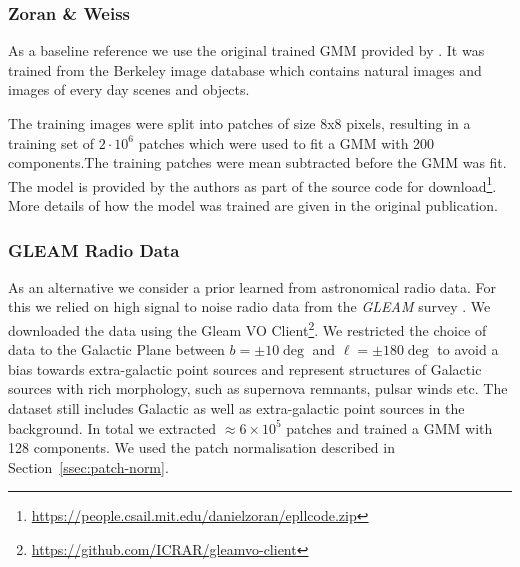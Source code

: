 \documentclass[twocolumn]{aastex631}
\begin{document}
    \subsubsection{Zoran \& Weiss}
    As a baseline reference we use the original trained GMM provided by \cite{Zoran2011}. It was trained from the Berkeley image database \citep{Martin2001} which contains natural images and images of every day scenes and objects. 
    
    The training images were split into patches of size 8x8 pixels, resulting in a training set of $2 \cdot 10^{6}$ patches which were used to fit a GMM with 200 components.The training patches were mean subtracted before the GMM was fit. The model is provided by the authors as part of the source code for download\footnote{\url{https://people.csail.mit.edu/danielzoran/epllcode.zip}}. More details of how the model was trained are given in the original publication. 

    
    \subsubsection{GLEAM Radio Data}
    \label{sssec:gleam-radio-data}
    As an alternative we consider a prior learned from astronomical radio data. For this we relied on high signal to noise radio data from the \textit{GLEAM} survey \cite{HurleyWalker2022}. We downloaded the data using the Gleam VO Client\footnote{\url{https://github.com/ICRAR/gleamvo-client}}. We restricted the choice of data to the Galactic Plane between $b=\pm10\deg$ and $\ell = \pm180\deg$ to avoid a bias towards extra-galactic point sources and represent structures of Galactic sources with rich morphology, such as supernova remnants, pulsar winds etc. The dataset still includes Galactic as well as extra-galactic point sources in the background. In total we extracted $\approx 6 \times 10^5$ patches and trained a GMM with 128 components. We used the patch normalisation described in Section~\ref{ssec:patch-norm}.
\end{document}
